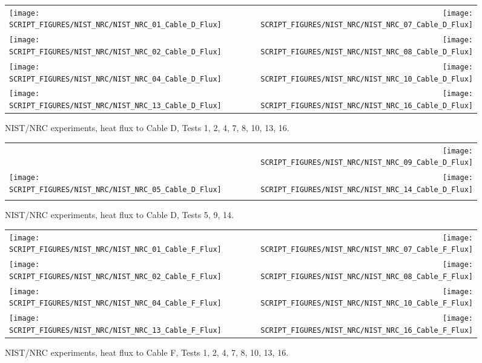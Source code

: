 \begin{figure}[p]
\begin{tabular*}{\textwidth}{l@{\extracolsep{\fill}}r}
\texttt{[image: SCRIPT\_FIGURES/NIST\_NRC/NIST\_NRC\_01\_Cable\_D\_Flux]} &
\texttt{[image: SCRIPT\_FIGURES/NIST\_NRC/NIST\_NRC\_07\_Cable\_D\_Flux]} \\
\texttt{[image: SCRIPT\_FIGURES/NIST\_NRC/NIST\_NRC\_02\_Cable\_D\_Flux]} &
\texttt{[image: SCRIPT\_FIGURES/NIST\_NRC/NIST\_NRC\_08\_Cable\_D\_Flux]} \\
\texttt{[image: SCRIPT\_FIGURES/NIST\_NRC/NIST\_NRC\_04\_Cable\_D\_Flux]} &
\texttt{[image: SCRIPT\_FIGURES/NIST\_NRC/NIST\_NRC\_10\_Cable\_D\_Flux]} \\
\texttt{[image: SCRIPT\_FIGURES/NIST\_NRC/NIST\_NRC\_13\_Cable\_D\_Flux]} &
\texttt{[image: SCRIPT\_FIGURES/NIST\_NRC/NIST\_NRC\_16\_Cable\_D\_Flux]}
\end{tabular*}
\caption{NIST/NRC experiments, heat flux to Cable D, Tests 1, 2, 4, 7, 8, 10, 13, 16.}
\label{NIST_NRC_Cable_D_Flux_Closed}
\end{figure}

\begin{figure}[p]
\begin{tabular*}{\textwidth}{l@{\extracolsep{\fill}}r}
                           &
\texttt{[image: SCRIPT\_FIGURES/NIST\_NRC/NIST\_NRC\_09\_Cable\_D\_Flux]} \\
\texttt{[image: SCRIPT\_FIGURES/NIST\_NRC/NIST\_NRC\_05\_Cable\_D\_Flux]} &
\texttt{[image: SCRIPT\_FIGURES/NIST\_NRC/NIST\_NRC\_14\_Cable\_D\_Flux]} \\
                      &
\end{tabular*}
\caption{NIST/NRC experiments, heat flux to Cable D, Tests 5, 9, 14.}
\label{NIST_NRC_Cable_D_Flux_Open}
\end{figure}

\begin{figure}[p]
\begin{tabular*}{\textwidth}{l@{\extracolsep{\fill}}r}
\texttt{[image: SCRIPT\_FIGURES/NIST\_NRC/NIST\_NRC\_01\_Cable\_F\_Flux]} &
\texttt{[image: SCRIPT\_FIGURES/NIST\_NRC/NIST\_NRC\_07\_Cable\_F\_Flux]} \\
\texttt{[image: SCRIPT\_FIGURES/NIST\_NRC/NIST\_NRC\_02\_Cable\_F\_Flux]} &
\texttt{[image: SCRIPT\_FIGURES/NIST\_NRC/NIST\_NRC\_08\_Cable\_F\_Flux]} \\
\texttt{[image: SCRIPT\_FIGURES/NIST\_NRC/NIST\_NRC\_04\_Cable\_F\_Flux]} &
\texttt{[image: SCRIPT\_FIGURES/NIST\_NRC/NIST\_NRC\_10\_Cable\_F\_Flux]} \\
\texttt{[image: SCRIPT\_FIGURES/NIST\_NRC/NIST\_NRC\_13\_Cable\_F\_Flux]} &
\texttt{[image: SCRIPT\_FIGURES/NIST\_NRC/NIST\_NRC\_16\_Cable\_F\_Flux]}
\end{tabular*}
\caption{NIST/NRC experiments, heat flux to Cable F, Tests 1, 2, 4, 7, 8, 10, 13, 16.}
\label{NIST_NRC_Cable_F_Flux_Closed}
\end{figure}

